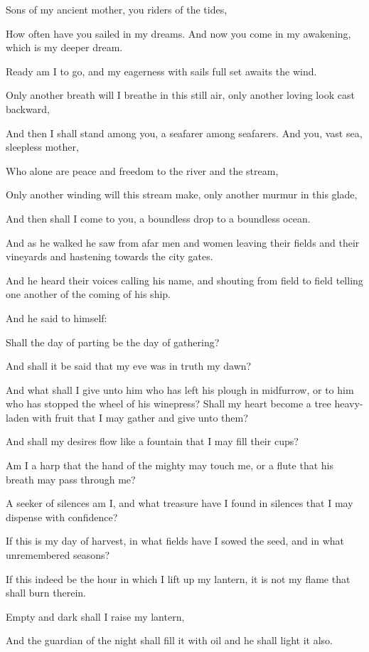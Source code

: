 Sons of my ancient mother, you riders of
the tides,

How often have you sailed in my dreams.
And now you come in my awakening, which
is my deeper dream.

Ready am I to go, and my eagerness with
sails full set awaits the wind.

Only another breath will I breathe in
this still air, only another loving look
cast backward,

And then I shall stand among you, a
seafarer among seafarers. And you,
vast sea, sleepless mother,

Who alone are peace and freedom to the
river and the stream,

Only another winding will this stream
make, only another murmur in this glade,

And then shall I come to you, a
boundless drop to a boundless ocean.


And as he walked he saw from afar men
and women leaving their fields and their
vineyards and hastening towards the city
gates.

And he heard their voices calling his
name, and shouting from field to field
telling one another of the coming of his
ship.

And he said to himself:

Shall the day of parting be the day of
gathering?

And shall it be said that my eve was in
truth my dawn?

And what shall I give unto him who has
left his plough in midfurrow, or to
him who has stopped the wheel of his
winepress? Shall my heart become a
tree heavy-laden with fruit that I may
gather and give unto them?

And shall my desires flow like a
fountain that I may fill their cups?

Am I a harp that the hand of the mighty
may touch me, or a flute that his breath
may pass through me?

A seeker of silences am I, and what
treasure have I found in silences that I
may dispense with confidence?

If this is my day of harvest, in what
fields have I sowed the seed, and in
what unremembered seasons?

If this indeed be the hour in which I
lift up my lantern, it is not my flame
that shall burn therein.

Empty and dark shall I raise my lantern,

And the guardian of the night shall fill
it with oil and he shall light it also.

